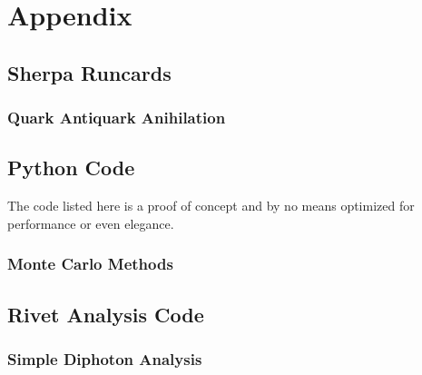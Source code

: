 \chapter{Appendix}%
\label{chap:appendix}

\section{Sherpa Runcards}%
\label{sec:runcards}

\subsection{Quark Antiquark Anihilation}%
\label{sec:qqggruncard}

\section{Python Code}%
\label{sec:pycode}
The code listed here is a proof of concept and by no means optimized
for performance or even elegance.

\subsection{Monte Carlo Methods}%
\label{sec:mcpy}

\section{Rivet Analysis Code}%
\label{sec:rivetcode}

\subsection{Simple Diphoton Analysis}%
\label{sec:simpdiphotriv}
